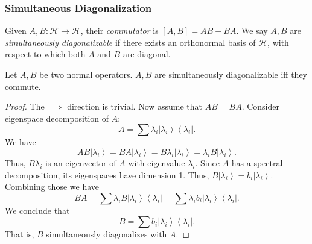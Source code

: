 \subsubsection{Simultaneous Diagonalization}



	Given $A, B: \mathscr{H} \to \mathscr{H}$, their \textit{commutator} is $[A, B] = AB - BA$. We say $A, B$ are \textit{simultaneously diagonalizable} if there exists an orthonormal basis of $\mathscr{H}$, with respect to which both $A$ and $B$ are diagonal.

\begin{theorem}
	\label{thm:SimultaneousDiagonalization}
	Let $A, B$ be two normal operators. $A, B$ are simultaneously diagonalizable iff they commute.
\end{theorem}
\begin{proof}
	The $\implies$ direction is trivial. Now assume that $AB = BA$. Consider eigenspace decomposition of $A$:
	\[
		A = \sum \lambda_i \left| \lambda_i \right\rangle \left\langle \lambda_i \right| 
	.\] 
	We have
	\[
		A B \left| \lambda_i \right\rangle 
	= B A \left| \lambda_i \right\rangle 
	= B \lambda_i \left| \lambda_i \right\rangle 
	= \lambda_i B \left| \lambda_i \right\rangle 
	.\] 
	Thus, $B \lambda_i$ is an eigenvector of $A$ with eigenvalue $\lambda_i$. Since $A$ has a spectral decomposition, its eigenspaces have dimension 1. Thus, $B \left| \lambda_i \right\rangle  = b_i \left| \lambda_i \right\rangle $. Combining those we have
	\[
		BA = \sum \lambda_i B \left| \lambda_i \right\rangle  \left\langle \lambda_i \right| 
			= \sum \lambda_i b_i \left| \lambda_i \right\rangle \left\langle \lambda_i \right| 
	.\] 
	We conclude that
	\[
		B = \sum b_i \left| \lambda_i \right\rangle  \left\langle \lambda_i \right| 
	.\] 
	That is, $B$ simultaneously diagonalizes with $A$.
\end{proof}


